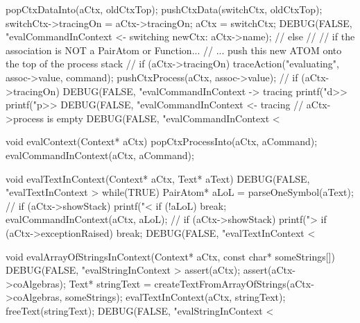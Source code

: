 {{{{        popCtxDataInto(aCtx, oldCtxTop);
        pushCtxData(switchCtx, oldCtxTop);
        switchCtx->tracingOn = aCtx->tracingOn;
        aCtx = switchCtx;
        DEBUG(FALSE, "evalCommandInContext <- switching newCtx: %
              aCtx->name);
        //
      } else {
        //
        // if the association is NOT a PairAtom or Function...
        // ... push this new ATOM onto the top of the process stack
        //
        if (aCtx->tracingOn) traceAction("evaluating", assoc->value, command);
        pushCtxProcess(aCtx, assoc->value);
        //
      }
    }
    if (aCtx->tracingOn) {
      DEBUG(FALSE, "evalCommandInContext -> tracing%
      printf("d>>%
      printf("p>>%
      DEBUG(FALSE, "evalCommandInContext <- tracing%
    }
  } // aCtx->process is empty
  DEBUG(FALSE, "evalCommandInContext < %
}

void evalContext(Context* aCtx) {
  popCtxProcessInto(aCtx, aCommand);
  evalCommandInContext(aCtx, aCommand);
}

void evalTextInContext(Context* aCtx, Text* aText) {
  DEBUG(FALSE, "evalTextInContext > %
  while(TRUE) {
    PairAtom* aLoL = parseOneSymbol(aText);
//    if (aCtx->showStack) printf("<%
    if (!aLoL) break;
    evalCommandInContext(aCtx, aLoL);
//    if (aCtx->showStack) printf(">%
    if (aCtx->exceptionRaised) break;
  }
  DEBUG(FALSE, "evalTextInContext < %
}

void evalArrayOfStringsInContext(Context* aCtx,
                                 const char* someStrings[]) {
  DEBUG(FALSE, "evalStringInContext > %
  assert(aCtx);
  assert(aCtx->coAlgebras);
  Text* stringText = createTextFromArrayOfStrings(aCtx->coAlgebras,
                                                  someStrings);
  evalTextInContext(aCtx, stringText);
  freeText(stringText);
  DEBUG(FALSE, "evalStringInContext < %
}

